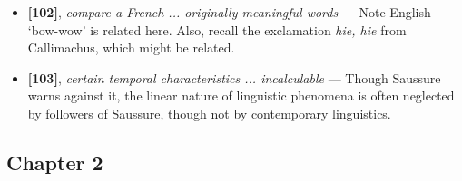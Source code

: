 \documentclass[12pt]{article}
\begin{document}
\begin{itemize}
\item \textbf{[102]}, \textit{compare a French ... originally meaningful words} --- Note English `bow-wow' is related here. Also, recall the exclamation \textit{hie, hie} from Callimachus, which might be related.

\item \textbf{[103]}, \textit{certain temporal characteristics ... incalculable} --- Though Saussure warns against it, the linear nature of linguistic phenomena is often neglected by followers of Saussure, though not by contemporary linguistics.

\end{itemize}

\subsection{Chapter 2}
\end{document}
